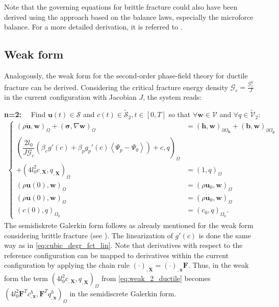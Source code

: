 Note that the governing equations for brittle fracture could also have been derived using the approach based on the balance laws, especially the microforce balance. For a more detailed derivation, it is referred to \citep{11_PF_DissBorden}. 


\subsection{Weak form}
Analogously, the weak form for the second-order phase-field theory for ductile fracture can be derived. Considering the critical fracture energy density $\mathcal{G}_{c}=\frac{\mathcal{G}_{c}^{0}}{J}$ in the current configuration with Jacobian $J$, the system reads:

\textbf{n=2:}$\quad$ Find $\mathbf{u}\left(t\right)\in\bm{\mathcal{S}}$ and $c\left(t\right)\in\tilde{\mathcal{S}}_{2},t\in\left[0,T\right]$ so that $\forall \mathbf{w}\in\bm{\mathcal{V}}$ and $\forall q\in\tilde{\mathcal{V}}_{2}$:
\begin{equation} \label{eq:weak_2_ductile}
\begin{aligned}
\left\{\begin{alignedat}{1}
	\left(\rho \ddot{\mathbf{u}},\mathbf{w}\right)_{\Omega} + \left(\bm{\sigma},\nabla\mathbf{w}\right)_{\Omega} &= \left(\mathbf{h},\mathbf{w}\right)_{\partial\Omega_{\mathbf{h}}} + \left(\mathbf{b},\mathbf{w}\right)_{\partial\Omega_{\mathbf{g}}} \\
	\left(\dfrac{2l_{0}}{J\mathcal{G}_{c}}\left(\beta_{e}g'\left(c\right)+\beta_{p}g_{p}'\left(c\right)\left<\Psi_{p}-\Psi_{0}\right>\right)+c,q\right)_{\Omega} & \\
	+\left(4l_{0}^{2} c_{,\mathbf{X}}, q_{,\mathbf{X}}\right)_{\Omega} &= \left(1,q\right)_{\Omega} \\
	\left(\rho\mathbf{u}\left(0\right),\mathbf{w}\right)_{\Omega} &= \left(\rho\mathbf{u}_{0},\mathbf{w}\right)_{\Omega} \\
	\left(\rho\dot{\mathbf{u}}\left(0\right),\mathbf{w}\right)_{\Omega} &= \left(\rho\dot{\mathbf{u}}_{0},\mathbf{w}\right)_{\Omega} \\
	\left(c\left(0\right),q\right)_{\Omega_{0}} &= \left(c_{0},q\right)_{\Omega_{0}}.
\end{alignedat}\right.
\end{aligned}
\end{equation}
The semidiskrete Galerkin form follows as already mentioned for the weak form considering brittle fracture (see ). The linearization of $g'\left(c\right)$ is done the same way as in \eqref{eq:cubic_degr_fct_lin}. Note that derivatives with respect to the reference configuration can be mapped to derivatives within the current configuration by applying the chain rule $\left(\cdot\right)_{,\mathbf{X}}=\left(\cdot\right)_{,\mathbf{x}}\mathbf{F}$. Thus, in the weak form the term $\left(4l_{0}^{2} c_{,\mathbf{X}}, q_{,\mathbf{X}}\right)_{\Omega}$ from \eqref{eq:weak_2_ductile} becomes $\left(4l_{0}^{2} \mathbf{F}^{T}c_{,\mathbf{x}}^{h}, \mathbf{F}^{T}q_{,\mathbf{x}}^{h}\right)_{\Omega}$ in the semidiscrete Galerkin form.

